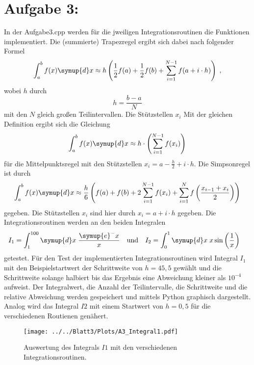 \section*{Aufgabe 3: }


In der Aufgabe3.cpp werden für die jweiligen Integrationsroutinen die Funktionen implementiert.
Die (summierte) Trapezregel ergibt sich dabei nach folgender Formel
\begin{equation*}
  \int_a^{b} f(x) \symup{d}x \approx h\left( \frac{1}{2} f(a)+\frac{1}{2} f(b) + \sum_{i=1}^{N-1} f(a+i\cdot h) \right) \; ,
\end{equation*}
wobei $h$ durch
\begin{equation*}
  h=\frac{b-a}{N}
\end{equation*}
mit den $N$ gleich großen Teilintervallen. Die Stützstellen $x_i$
Mit der gleichen Definition ergibt sich die Gleichung
\begin{equation*}
  \int_a^{b} f(x) \symup{d}x \approx h\cdot \left( \sum_{i=1}^{N-1} f(x_i) \right)
\end{equation*}
für die Mittelpunktsregel mit den Stützstellen $x_i=a-\frac{h}{2}+i\cdot h$.
Die Simpsonregel ist durch
\begin{equation*}
  \int_a^{b} f(x) \symup{d}x \approx \frac{h}{6} \left( f(a)+f(b)+2\sum_{i=1}^{N-1} f(x_i) + \sum_{i=1}^N f\left(\frac{x_{i-1}+x_i}{2} \right) \right)
\end{equation*}
gegeben.
Die Stützstellen $x_i$ sind hier durch $x_i=a+i\cdot h$ gegeben.
Die Integrationsroutinen werden an den beiden Integralen
\begin{align*}
  I_1 =\int_1^{100} \symup{d}x \; \frac{\symup{e}^-x}{x} \quad \text{und} \quad & I_2 =\int_0^1 \symup{d}x \; x\sin\left(\frac{1}{x}\right)
\end{align*}
getestet.
Für den Test der implementierten Integrationsroutinen wird Integral $I_1$ mit den Beispielstartwert der Schrittweite von $h=45,5$ gewählt und die Schrittweite solange halbiert bis das Ergebnis eine Abweichung kleiner als $10^{-4}$ aufweist. Der Integralwert, die Anzahl der Teilintervalle, die Schrittweite und die relative Abweichung werden gespeichert und mittels Python graphisch dargestellt. Analog wird das Integral $I2$ mit einem Startwert von $h=0,5$ für die verschiedenen Routienen genähert.

\begin{figure}[H]
  \texttt{[image: ../../Blatt3/Plots/A3\_Integral1.pdf]}
  \caption{Auswertung des Integrals $I1$ mit den verschiedenen Integrationsroutinen.}
  \label{fig:I1}
\end{figure}

